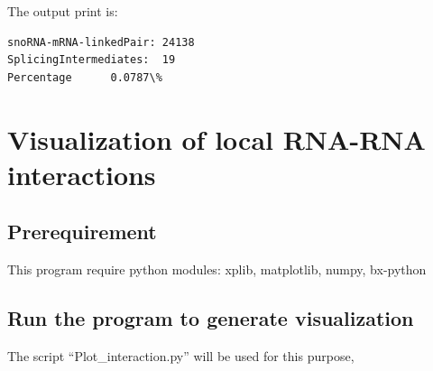 \documentclass[letterpaper,10pt,english]{sphinxmanual}
\begin{document}
The output print is:

\begin{Verbatim}[commandchars=\\\{\}]
snoRNA-mRNA-linkedPair: 24138
SplicingIntermediates:  19
Percentage      0.0787\%
\end{Verbatim}


\chapter{Visualization of local RNA-RNA interactions}
\label{Visualization::doc}\label{Visualization:visualization-of-local-rna-rna-interactions}\label{Visualization:visualizationlocal}

\section{Prerequirement}
\label{Visualization:prerequirement}
This program require python modules: xplib, matplotlib, numpy, bx-python


\section{Run the program to generate visualization}
\label{Visualization:plotinteraction}\label{Visualization:run-the-program-to-generate-visualization}
The script ``Plot\_interaction.py'' will be used for this purpose,
\end{document}
